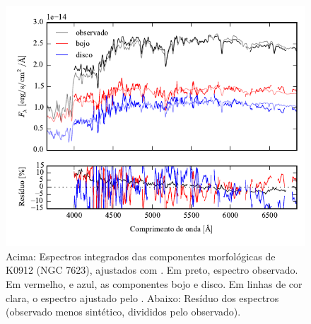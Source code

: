 \begin{figure}
	\includegraphics[page=17]{figuras/sample006a_synthesis}
	\caption[Espectros ajustados com \starlight das componentes morfológicas de
	K0912 (NGC 7623)]
	{Acima: Espectros integrados das componentes morfológicas de
	K0912 (NGC 7623), ajustados com \starlight. Em preto, espectro observado. Em
	vermelho, e azul, as componentes bojo e disco. Em linhas de cor clara, o
	espectro ajustado pelo \starlight. Abaixo: Resíduo dos espectros (observado
	menos sintético, divididos pelo observado).}
	\label{fig:decompSintese:K0912}
\end{figure}

